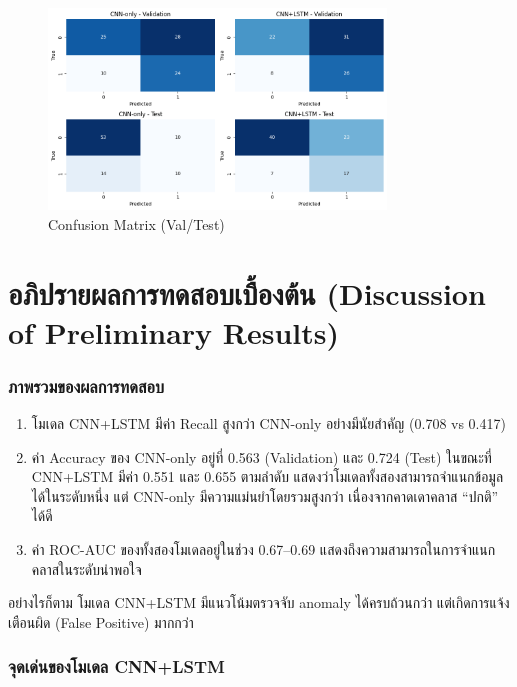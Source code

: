 \begin{figure}[H]
\begin{center}
\includegraphics[width=0.8\textwidth]{Image/Confusion Matrix.png}
\end{center}
\caption[Confusion Matrix (Val/Test)]{Confusion Matrix (Val/Test)}
\end{figure}

\newpage
\section{อภิปรายผลการทดสอบเบื้องต้น (Discussion of Preliminary Results)}

\subsubsection{ภาพรวมของผลการทดสอบ}

\begin{enumerate}
    \item โมเดล CNN+LSTM มีค่า Recall สูงกว่า CNN-only อย่างมีนัยสำคัญ (0.708 vs 0.417)
    \item ค่า Accuracy ของ CNN-only อยู่ที่ 0.563 (Validation) และ 0.724 (Test) ในขณะที่ \\ CNN+LSTM มีค่า 0.551 และ 0.655 ตามลำดับ แสดงว่าโมเดลทั้งสองสามารถจำแนกข้อมูลได้ในระดับหนึ่ง แต่ CNN-only มีความแม่นยำโดยรวมสูงกว่า เนื่องจากคาดเดาคลาส “ปกติ” ได้ดี
    \item ค่า ROC-AUC ของทั้งสองโมเดลอยู่ในช่วง 0.67–0.69 แสดงถึงความสามารถในการจำแนกคลาสในระดับน่าพอใจ
\end{enumerate}
อย่างไรก็ตาม โมเดล CNN+LSTM มีแนวโน้มตรวจจับ anomaly ได้ครบถ้วนกว่า แต่เกิดการแจ้งเตือนผิด (False Positive) มากกว่า

\subsubsection{จุดเด่นของโมเดล CNN+LSTM}

